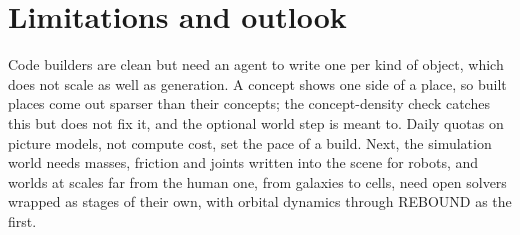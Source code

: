 \section{Limitations and outlook}\label{limitations-and-outlook}

Code builders are clean but need an agent to write one per kind of object, which does not scale as well as generation. A concept shows one side of a place, so built places come out sparser than their concepts; the concept-density check catches this but does not fix it, and the optional world step is meant to. Daily quotas on picture models, not compute cost, set the pace of a build. Next, the simulation world needs masses, friction and joints written into the scene for robots, and worlds at scales far from the human one, from galaxies to cells, need open solvers wrapped as stages of their own, with orbital dynamics through REBOUND \citep{rein2012rebound} as the first.
